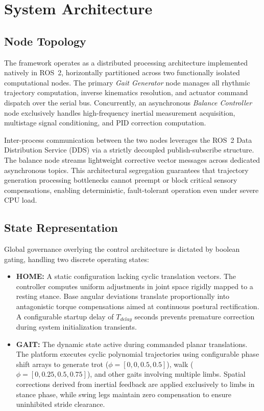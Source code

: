 \section{System Architecture}

\subsection{Node Topology}

The framework operates as a distributed processing architecture implemented natively in ROS~2, horizontally partitioned across two functionally isolated computational nodes. The primary \textit{Gait Generator} node manages all rhythmic trajectory computation, inverse kinematics resolution, and actuator command dispatch over the serial bus. Concurrently, an asynchronous \textit{Balance Controller} node exclusively handles high-frequency inertial measurement acquisition, multistage signal conditioning, and PID correction computation.

Inter-process communication between the two nodes leverages the ROS~2 Data Distribution Service (DDS) via a strictly decoupled publish-subscribe structure. The balance node streams lightweight corrective vector messages across dedicated asynchronous topics. This architectural segregation guarantees that trajectory generation processing bottlenecks cannot preempt or block critical sensory compensations, enabling deterministic, fault-tolerant operation even under severe CPU load.

\subsection{State Representation}

Global governance overlying the control architecture is dictated
by boolean gating, handling two discrete operating states:

\begin{itemize}
    \item \textbf{HOME:} A static configuration lacking cyclic
    translation vectors. The controller computes uniform
    adjustments in joint space rigidly mapped to a resting stance.
    Base angular deviations translate proportionally into
    antagonistic torque compensations aimed at continuous postural
    rectification. A configurable startup delay of $T_{delay}$
    seconds prevents premature correction during system
    initialization transients.

    \item \textbf{GAIT:} The dynamic state active during commanded
    planar translations. The platform executes cyclic polynomial
    trajectories using configurable phase shift arrays to generate
    trot ($\phi = [0, 0, 0.5, 0.5]$), walk ($\phi = [0, 0.25,
    0.5, 0.75]$), and other gaits involving multiple limbs.
    Spatial corrections derived from inertial feedback are applied
    exclusively to limbs in stance phase, while swing legs maintain
    zero compensation to ensure uninhibited stride clearance.
\end{itemize}
